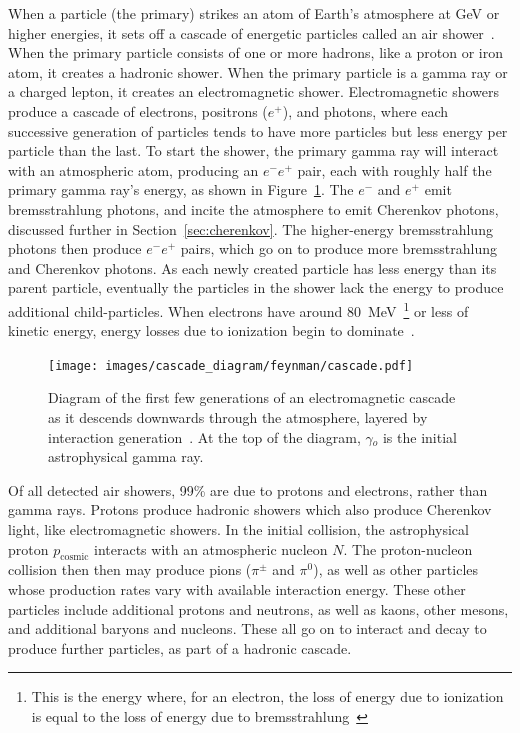   When a particle (the primary) strikes an atom of Earth's atmosphere at GeV or higher energies, it sets off a cascade of energetic particles called an air shower~\cite{Bethe1934,Klein1999}.
  When the primary particle consists of one or more hadrons, like a proton or iron atom, it creates a hadronic shower.
  When the primary particle is a gamma ray or a charged lepton, it creates an electromagnetic shower.
  Electromagnetic showers produce a cascade of electrons, positrons ($e^{+}$), and photons, where each successive generation of particles tends to have more particles but less energy per particle than the last.
  To start the shower, the primary gamma ray will interact with an atmospheric atom, producing an $e^{-}e^{+}$ pair, each with roughly half the primary gamma ray's energy, as shown in Figure~\ref{fig:emcascade}.
  The $e^{-}$ and $e^{+}$ emit bremsstrahlung photons, and incite the atmosphere to emit Cherenkov photons, discussed further in Section~\ref{sec:cherenkov}.
  The higher-energy bremsstrahlung photons then produce $e^{-}e^{+}$ pairs, which go on to produce more bremsstrahlung and Cherenkov photons.
  As each newly created particle has less energy than its parent particle, eventually the particles in the shower lack the energy to produce additional child-particles.
  When electrons have around \SI{80}{\MeV{}}\footnote{This is the energy where, for an electron, the loss of energy due to ionization is equal to the loss of energy due to bremsstrahlung~\cite{tanabashi2018review,berger196410}} or less of kinetic energy, energy losses due to ionization begin to dominate~\cite{pdg_2014}.

  \begin{figure}[!t]
    \centering
    \texttt{[image: images/cascade\_diagram/feynman/cascade.pdf]}
    \caption[Electromagnetic Cascade]{
      Diagram of the first few generations of an electromagnetic cascade as it descends downwards through the atmosphere, layered by interaction generation~\cite{ellis2017tikz}.
      At the top of the diagram, $\gamma{}_o$ is the initial astrophysical gamma ray.
      \CaptionBlankLine
    }
    \label{fig:emcascade}
  \end{figure}

  Of all detected air showers, \nicetilde{}99\% are due to protons and electrons, rather than gamma rays.
  Protons produce hadronic showers which also produce Cherenkov light, like electromagnetic showers.
  In the initial collision, the astrophysical proton $p_{\textrm{cosmic}}$ interacts with an atmospheric nucleon $N$.
  The proton-nucleon collision then then may produce pions ($\pi^{\pm}$ and $\pi^{0}$), as well as other particles whose production rates vary with available interaction energy.
  These other particles include additional protons and neutrons, as well as kaons, other mesons, and additional baryons and nucleons.
  These all go on to interact and decay to produce further particles, as part of a hadronic cascade.

